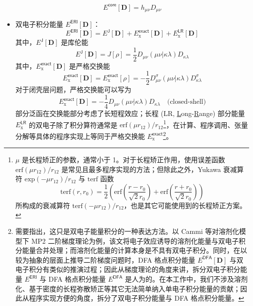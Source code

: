 \begin{itemize}[nosep]
        \begin{equation}
          E^\textsf{core} [\mathbf{D}] = h_{\mu \nu} D_{\mu \nu}
        \end{equation}
  \item 双电子积分能量 $E^\textsf{ERI} [\mathbf{D}]$：
        \begin{equation}
          E^\textsf{ERI} [\mathbf{D}] = E^\textsf{J} [\mathbf{D}] + E_\mathrm{x}^\textsf{exact} [\mathbf{D}] + E_\mathrm{x}^\textsf{LR} [\mathbf{D}]
        \end{equation}
        其中，$E^\textsf{J} [\mathbf{D}]$ 是库伦能
        \begin{equation}
          E^\textsf{J} [\mathbf{D}] = J[\rho] = \frac{1}{2} D_{\mu \nu} (\mu \nu | \kappa \lambda) D_{\kappa \lambda}
        \end{equation}
        其中，$E_\mathrm{x}^\textsf{exact} [\mathbf{D}]$ 是严格交换能
        \begin{equation}
          E_\mathrm{x}^\textsf{exact} [\mathbf{D}] = E_\mathrm{x}^\textsf{exact} [\rho] = - \frac{1}{2} D_{\mu \nu}^\sigma (\mu \nu | \kappa \lambda) D_{\kappa \lambda}^\sigma
        \end{equation}
        对于闭壳层问题，严格交换能可以写为
        \begin{equation}
          E_\mathrm{x}^\textsf{exact} [\mathbf{D}] = - \frac{1}{4} D_{\mu \nu} (\mu \nu | \kappa \lambda) D_{\kappa \lambda} \quad \text{(closed-shell)}
        \end{equation}
        部分泛函在交换能部分考虑了长短程效应；长程 (LR, \underline{L}ong-\underline{R}ange) 部分能量 $E_\mathrm{x}^\textsf{LR}$ 的双电子除了积分算符通常是 $\mathrm{erf} (\mu r_{12}) / r_{12}$\footnote{$\mu$ 是长程矫正的参数，通常小于 1。对于长程矫正作用，使用误差函数 $\mathrm{erf} (\mu r_{12}) / r_{12}$ 是常见且最多程序实现的方法；但除此之外，Yukawa 衰减算符 $\mathrm{exp} (-\mu r_{12}) / r_{12}$\cite{Savin-Flad.IJQC.1995} 与 $\mathrm{terf}$ 函数 $$\mathrm{terf} (r, r_0) = \frac{1}{2} \left( \mathrm{erf} \left(\frac{r - r_0}{\sqrt{2} r_0}\right) + \mathrm{erf} \left(\frac{r + r_0}{\sqrt{2} r_0}\right) \right)$$ 所构成的衰减算符 $\mathrm{terf} (-\mu r_{12}) / r_{12}$\cite{Goldey-Head-Gordon.PCCP.2013}，也是其它可能使用到的长程矫正方案。}，在计算、程序调用、张量分解等具体的程序实现上等同于严格交换能 $E_\mathrm{x}^\textsf{exact}$\footnote{需要指出，这只是双电子能量积分的一种表达方法。以 Cammi 等\cite{Cammi-Frisch.TCA.2004}对溶剂化模型下 MP2 二阶梯度理论为例，该文将电子效应诱导的溶剂化能量与双电子积分能量合并处理；而溶剂化能量的计算本身是不具有双电子积分。同时，在以较为抽象的层面上推导二阶梯度问题时，DFA 格点积分能量 $E^\textsf{DFA} [\mathbf{D}]$ 与双电子积分有类似的推演过程；因此从梯度理论的角度来讲，拆分双电子积分能量 $E^\textsf{ERI}$ 与 DFA 格点积分能量 $E^\textsf{DFA}$ 是人为的。在本工作中，我们不涉及溶剂化、基于密度的长程弥散矫正等其它无法简单纳入单电子积分能量的贡献；因此从程序实现方便的角度，拆分了双电子积分能量与 DFA 格点积分能量。}。

\end{itemize}
